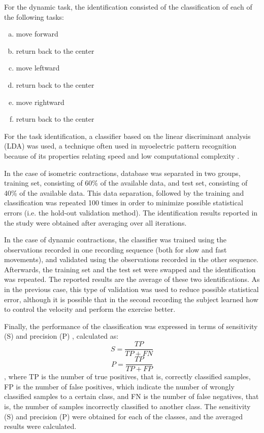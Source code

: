 For the dynamic task, the identification consisted of the classification of each of the following tasks:
 
\begin{enumerate}[a)]
\item move forward
\item return back to the center
\item move leftward
\item return back to the center
\item move rightward
\item return back to the center
\end{enumerate}

For the task identification, a classifier based on the linear discriminant analysis (LDA) was used, a technique often used in myoelectric pattern recognition because of its properties relating speed and low computational complexity \citep{Zhou2007}.

In the case of isometric contractions, database was separated in two groups, training set, consisting of 60\% of the available data, and test set, consisting of 40\% of the available data. This data separation, followed by the training and classification was repeated 100 times in order to minimize possible statistical errors (i.e. the hold-out validation method). The identification results reported in the study were obtained after averaging over all iterations.

In the case of dynamic contractions, the classifier was trained using the observations recorded in one recording sequence (both for slow and fast movements), and validated using the observations recorded in the other sequence. Afterwards, the training set and the test set were swapped and the identification was repeated. The reported results are the average of these two identifications. As in the previous case, this type of validation was used to reduce possible statistical error, although it is possible that in the second recording the subject learned how to control the velocity and perform the exercise better.

Finally, the performance of the classification was expressed in terms of sensitivity (S) and precision (P) \citep{Farina2001}, calculated as:
\begin{equation}
S = \frac{TP}{TP+FN}
\end{equation}
\begin{equation}
P = \frac{TP}{TP+FP}
\end{equation}
, where TP is the number of true positives, that is, correctly classified samples, FP is the number of false positives, which indicate the number of wrongly classified samples to a certain class, and FN is the number of false negatives, that is, the number of samples incorrectly classified to another class. The sensitivity (S) and precision (P) were obtained for each of the classes, and the averaged results were calculated.


